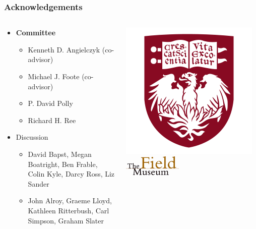\documentclass{beamer}
\begin{document}
\begin{frame}
  \frametitle{Acknowledgements}
  \begin{columns}
    \begin{column}{0.5\textwidth}
      \begin{itemize}
        \item \textbf{Committee}
          \begin{itemize}
            \item Kenneth D. Angielczyk (co-advisor)
            \item Michael J. Foote (co-advisor)
            \item P. David Polly
            \item Richard H. Ree
          \end{itemize}
        \item Discussion
          \begin{itemize}
            \item David Bapst, Megan Boatright, Ben Frable, Colin Kyle, Darcy Ross, Liz Sander
            \item John Alroy, Graeme Lloyd, Kathleen Ritterbush, Carl Simpson, Graham Slater
          \end{itemize}
      \end{itemize}
    \end{column}
    \begin{column}{0.5\textwidth}
      \includegraphics[height = 0.3\textheight, keepaspectratio = true]{figure/chicago} 
      \includegraphics[width = 0.4\textwidth, keepaspectratio = true]{figure/field}


\end{column}
\end{columns}
\end{frame}
\end{document}
